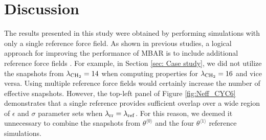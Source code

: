 \documentclass[journal=jced,manuscript=article]{achemso}
\begin{document}
%
%
%

\section{Discussion} \label{sec: Discussion}

The results presented in this study were obtained by performing simulations with only a single reference force field. As shown in previous studies, a logical approach for improving the performance of MBAR is to include additional reference force fields \cite{Postdoc_1,Postdoc_2}. For example, in Section \ref{sec: Case study}, we did not utilize the snapshots from $\lambda_{\rm CH_2} = 14$ when computing properties for $\lambda_{\rm CH_2} = 16$ and vice versa. Using multiple reference force fields would certainly increase the number of effective snapshots. However, the top-left panel of Figure \ref{fig:Neff_CYC6} demonstrates that a single reference provides sufficient overlap over a wide region of $\epsilon$ and $\sigma$ parameter sets when $\lambda_{\rm rr} = \lambda_{\rm ref}$. For this reason, we deemed it unnecessary to combine the snapshots from $\theta^{\langle0\rangle}$ and the four $\theta^{\langle1\rangle}$ reference simulations.
\end{document}
